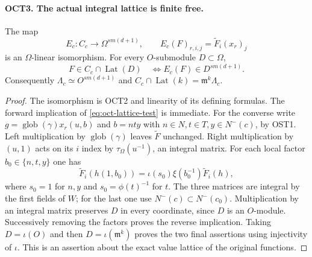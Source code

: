 \paragraph{OCT3. The actual integral lattice is finite free.}
\label{claim:OCT3}
The map
\[
 E_c:C_c\longrightarrow\Omega^{s m(d+1)},\qquad
       E_c(F)_{r,i,j}=\widetilde F_i(x_r)_j
\]
is an $\Omega$-linear isomorphism.  For every $O$-submodule
$D\subset\Omega$,
\begin{equation}\label{eq:oct-lattice-test}
 F\in C_c\cap\operatorname{Lat}(D)\quad\Longleftrightarrow
          E_c(F)\in D^{s m(d+1)}.
\end{equation}
Consequently $\Lambda_c\simeq O^{s m(d+1)}$ and
$C_c\cap\operatorname{Lat}(k)=\mathfrak m^k\Lambda_c$.
\begin{proof}
The isomorphism is OCT2 and linearity of its defining formulas.
The forward implication of \eqref{eq:oct-lattice-test} is immediate.
For the converse write
$g=\operatorname{glob}(\gamma)x_r(u,b)$ and
$b=nty$ with $n\in N,t\in T,y\in N^-(c)$, by OST1.
Left multiplication by $\operatorname{glob}(\gamma)$ leaves
$\widetilde F$ unchanged.  Right multiplication by $(u,1)$ acts
on its $i$ index by $\tau_\Omega(u^{-1})$, an integral matrix.
For each local factor $b_0\in\{n,t,y\}$ one has
\[
 \widetilde F_i(h(1,b_0))=
          \iota(s_0)\xi(b_0^{-1})\widetilde F_i(h),
\]
where $s_0=1$ for $n,y$ and $s_0=\phi(t)^{-1}$ for $t$.
The three matrices are integral by the first fields of $W$;
for the last one use $N^-(c)\subset N^-(c_0)$.  Multiplication
by an integral matrix preserves $D$ in every coordinate, since
$D$ is an $O$-module.  Successively removing the factors proves
the reverse implication.  Taking $D=\iota(O)$ and then
$D=\iota(\mathfrak m^k)$ proves the two final assertions using
injectivity of $\iota$.  This is an assertion about the exact
value lattice of the original functions.
\end{proof}


